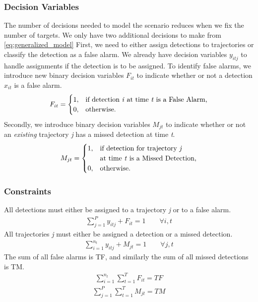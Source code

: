\subsubsection{Decision Variables}
The number of decisions needed to model the scenario reduces when we fix the number of targets. We only have two additional decisions to make from \eqref{eq:generalized_model} First, we need to either assign detections to trajectories or classify the detection as a false alarm. We already have decision variables $y_{itj}$ to handle assignments if the detection is to be assigned. To identify false alarms, we introduce new binary decision variables $F_{it}$ to indicate whether or not a detection $x_{it}$ is a false alarm. 
\[F_{it} = 
\begin{cases}
1, & \text{if detection \textit{i} at time \textit{t} is a False Alarm,}\\
0, & \text{otherwise.}
\end{cases}\]
Secondly, we introduce binary decision variables $M_{jt}$ to indicate whether or not an \textit{existing} trajectory \textit{j} has a missed detection at time \textit{t}.
\[M_{jt} =
\begin{cases}
1, & \text{if detection for trajectory \textit{j}}\\
   &\text{at time \textit{t} is a Missed Detection,}\\
0, & \text{otherwise.}
\end{cases}\]

\subsubsection{Constraints}
All detections must either be assigned to a trajectory \textit{j} or to a false alarm. 
\begin{align}\label{eqn: FA Simple}
\sum_{j=1}^{P} y_{itj} + F_{it} = 1 \qquad \forall i,t
\end{align}
All trajectories \textit{j} must either be assigned a detection or a missed detection. 
\begin{align}
\sum_{i=1}^{n_{t}} y_{itj} + M_{jt} = 1 \qquad \forall j,t
\end{align}
The sum of all false alarms is TF, and similarly the sum of all missed detections is TM. 
\begin{align}
\sum_{i=1}^{n_{t}} \sum_{t=1}^{T} F_{it} = TF
\end{align}
\begin{align}\label{eqn: MD Total}
\sum_{j=1}^{P} \sum_{t=1}^{T} M_{jt} = TM 
\end{align}

